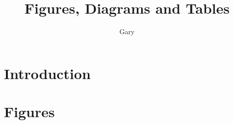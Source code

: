 \documentclass[a4paper, twocolumn]{article}
\title{Figures, Diagrams and Tables}
\author{Gary}
\begin{document}
\maketitle	

\begin{abstract}
	\lipsum[1]
\end{abstract}

\tableofcontents

\section{Introduction}
\lipsum[1-5]

\section{Figures}\label{sect:figures}
\lipsum[1-3]
\end{document}
